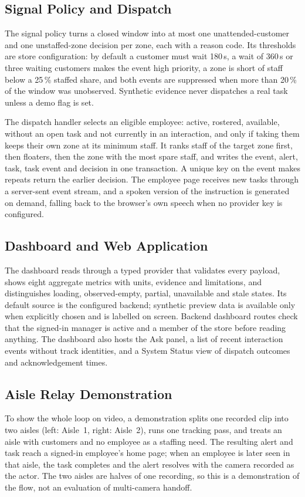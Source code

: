\subsection{Signal Policy and Dispatch}
The signal policy turns a closed window into at most one unattended-customer and one unstaffed-zone decision per zone, each with a reason code. Its thresholds are store configuration: by default a customer must wait 180\,s, a wait of 360\,s or three waiting customers makes the event high priority, a zone is short of staff below a 25\,\% staffed share, and both events are suppressed when more than 20\,\% of the window was unobserved. Synthetic evidence never dispatches a real task unless a demo flag is set.

The dispatch handler selects an eligible employee: active, rostered, available, without an open task and not currently in an interaction, and only if taking them keeps their own zone at its minimum staff. It ranks staff of the target zone first, then floaters, then the zone with the most spare staff, and writes the event, alert, task, task event and decision in one transaction. A unique key on the event makes repeats return the earlier decision. The employee page receives new tasks through a server-sent event stream, and a spoken version of the instruction is generated on demand, falling back to the browser's own speech when no provider key is configured.

\subsection{Dashboard and Web Application}
The dashboard reads through a typed provider that validates every payload, shows eight aggregate metrics with units, evidence and limitations, and distinguishes loading, observed-empty, partial, unavailable and stale states. Its default source is the configured backend; synthetic preview data is available only when explicitly chosen and is labelled on screen. Backend dashboard routes check that the signed-in manager is active and a member of the store before reading anything. The dashboard also hosts the Ask panel, a list of recent interaction events without track identities, and a System Status view of dispatch outcomes and acknowledgement times.

\subsection{Aisle Relay Demonstration}
To show the whole loop on video, a demonstration splits one recorded clip into two aisles (left: Aisle~1, right: Aisle~2), runs one tracking pass, and treats an aisle with customers and no employee as a staffing need. The resulting alert and task reach a signed-in employee's home page; when an employee is later seen in that aisle, the task completes and the alert resolves with the camera recorded as the actor. The two aisles are halves of one recording, so this is a demonstration of the flow, not an evaluation of multi-camera handoff.

